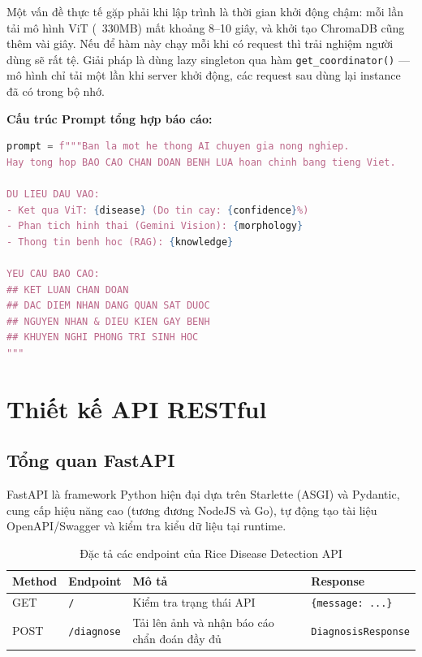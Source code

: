 \documentclass[13pt,a4paper]{extreport}
\begin{document}
Một vấn đề thực tế gặp phải khi lập trình là thời gian khởi động chậm: mỗi lần tải mô hình ViT (~330MB) mất khoảng 8--10 giây, và khởi tạo ChromaDB cũng thêm vài giây. Nếu để hàm này chạy mỗi khi có request thì trải nghiệm người dùng sẽ rất tệ. Giải pháp là dùng lazy singleton qua hàm \texttt{get\_coordinator()} --- mô hình chỉ tải một lần khi server khởi động, các request sau dùng lại instance đã có trong bộ nhớ.

\textbf{Cấu trúc Prompt tổng hợp báo cáo:}
\begin{lstlisting}[language=Python, caption={Prompt tổng hợp báo cáo trong Coordinator Agent}, label={lst:coordinator_prompt}]
prompt = f"""Ban la mot he thong AI chuyen gia nong nghiep.
Hay tong hop BAO CAO CHAN DOAN BENH LUA hoan chinh bang tieng Viet.

DU LIEU DAU VAO:
- Ket qua ViT: {disease} (Do tin cay: {confidence}%)
- Phan tich hinh thai (Gemini Vision): {morphology}
- Thong tin benh hoc (RAG): {knowledge}

YEU CAU BAO CAO:
## KET LUAN CHAN DOAN
## DAC DIEM NHAN DANG QUAN SAT DUOC
## NGUYEN NHAN & DIEU KIEN GAY BENH
## KHUYEN NGHI PHONG TRI SINH HOC
"""
\end{lstlisting}

\section{Thiết kế API RESTful}

\subsection{Tổng quan FastAPI}
FastAPI là framework Python hiện đại dựa trên Starlette (ASGI) và Pydantic, cung cấp hiệu năng cao (tương đương NodeJS và Go), tự động tạo tài liệu OpenAPI/Swagger và kiểm tra kiểu dữ liệu tại runtime.

\begin{table}[H]
\centering
\caption{Đặc tả các endpoint của Rice Disease Detection API}
\label{tab:api_endpoints}
\begin{tabularx}{\textwidth}{p{1.5cm} p{2.8cm} X p{3.5cm}}
\toprule
\textbf{Method} & \textbf{Endpoint} & \textbf{Mô tả} & \textbf{Response} \\
\midrule
GET  & \texttt{/}         & Kiểm tra trạng thái API & \texttt{\{message: ...\}} \\[4pt]
POST & \texttt{/diagnose} & Tải lên ảnh và nhận báo cáo chẩn đoán đầy đủ & \texttt{DiagnosisResponse} \\
\bottomrule
\end{tabularx}
\end{table}
\end{document}

